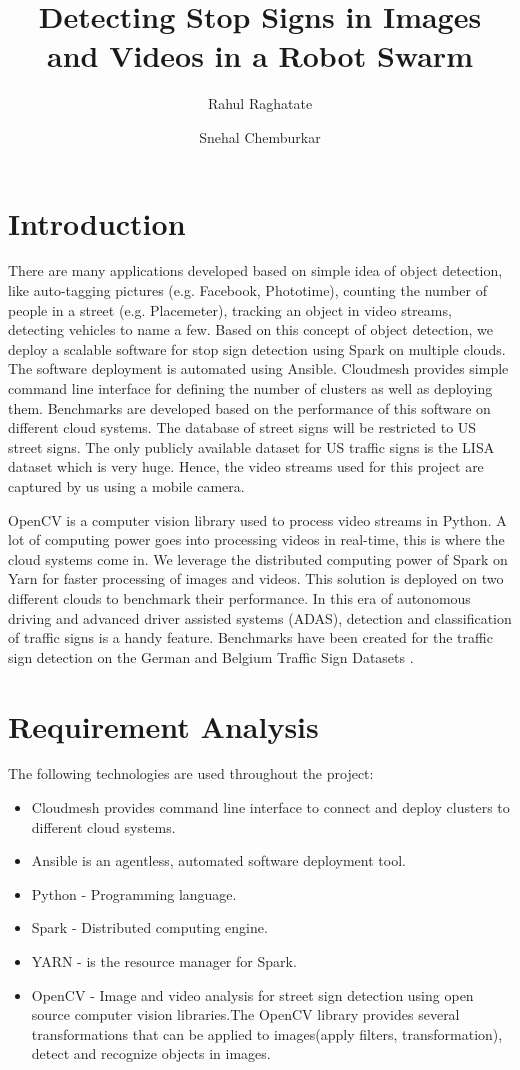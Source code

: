 \documentclass[9pt,twocolumn,twoside]{../../styles/osajnl}
\title{Detecting Stop Signs in Images and Videos in a Robot Swarm}
\author[1,*]{Rahul Raghatate}
\author[1]{Snehal Chemburkar}
\affil[1]{School of Informatics and Computing, Bloomington, IN 47408,
  U.S.A.}
\affil[*]{Corresponding authors: rraghata@iu.edu, snehchem@iu.edu}
\begin{document}
\maketitle

\section{Introduction}
There are many applications developed based on simple idea of object
detection, like auto-tagging pictures (e.g. Facebook, Phototime),
counting the number of people in a street (e.g. Placemeter), tracking
an object in video streams, detecting vehicles to name a few.  Based
on this concept of object detection, we deploy a scalable software for
stop sign detection using Spark on multiple clouds.  The software
deployment is automated using Ansible. Cloudmesh provides simple
command line interface for defining the number of clusters as well as
deploying them. Benchmarks are developed based on the performance of
this software on different cloud systems. The database of street signs
will be restricted to US street signs. The only publicly available
dataset for US traffic signs is the LISA dataset
\cite{paper-lisadataset} which is very huge. Hence, the video streams
used for this project are captured by us using a mobile camera.

OpenCV is a computer vision library used to process video streams in
Python. A lot of computing power goes into processing videos in
real-time, this is where the cloud systems come in. We leverage the
distributed computing power of Spark on Yarn for faster processing of
images and videos. This solution is deployed on two different clouds
to benchmark their performance.  In this era of autonomous driving and
advanced driver assisted systems (ADAS), detection and classification
of traffic signs is a handy feature. Benchmarks have been created for
the traffic sign detection on the German and Belgium Traffic Sign
Datasets \cite{paper-trafficsign}.

\section{Requirement Analysis}
The following technologies are used throughout the project:
\begin{itemize}
\item Cloudmesh provides command line interface to connect and deploy
  clusters to different cloud systems.
\item Ansible is an agentless, automated software deployment tool.
\item Python - Programming language.
\item Spark - Distributed computing engine.
\item YARN - is the resource manager for Spark.

\item OpenCV - Image and video analysis for street sign detection
  using open source computer vision libraries.The OpenCV library
  provides several transformations that can be applied to images(apply
  filters, transformation), detect and recognize objects in images.
\end{itemize}
\end{document}
